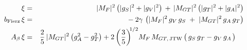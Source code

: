 %
%
%
\begin{eqnarray}
\xi &=& 
	|M_F|^2    \left( |g_S|^2 + |g_V|^2 \right) \,+\, 
	|M_{GT}|^2 \left( |g_T|^2 + |g_A|^2 \right)
	\label{eq:jtw_xi_integrated_LH} 
	\\
\bFierz \, \xi &=& 
	- \: 2 \gamma \,
	\left( |M_F|^2 \, g_V \,g_S  \;+\; |M_{GT}|^2 \, g_A \, g_T \right) 
	\label{eq:jtw_bxi_integrated_LH} 
	\\
\Abeta \, \xi &=& 
	\frac{2}{5} \, |M_{GT}|^2 \left( g_A^2 - g_T^2 \right) + 
	2 \left( \frac{3}{5} \right)^{\!\! 1/2} \!
	M_F\,M_{GT, \textrm{\,JTW}} \left(\, g_S \, g_T - g_V \, g_A \phantom{g_A^2 \!\!\!\! \!\! } \right) 
	\;\;\;\;
	\label{eq:jtw_Abetaxi_integrated_LH}
\end{eqnarray}
%